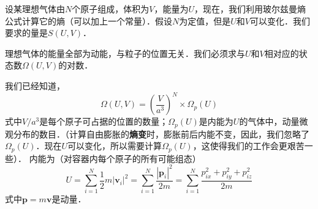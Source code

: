 
设某理想气体由$N $个原子组成，体积为$V$，能量为$U$，现在，我们利用玻尔兹曼熵公式计算它的熵（可以加上一个常量）．假设$N $为定值，但是$U $和$V $可以变化．我们要求的量是$S(U,V)$．

理想气体的能量全部为动能，与粒子的位置无关．我们必须求与$U$和$V$相对应的状态数$\Omega(U,V)$的对数．

我们已经知道，
\begin{equation}
\Omega \left( U,V \right) =\left( \frac{V}{a^3} \right) ^N\times \Omega _p\left( U \right) 
\end{equation}
式中$V/a^3$是每个原子可占据的位置的数量；$\Omega_p(U)$是内能为$U$的气体中，动量微观分布的数目．（计算自由膨胀的\textbf{熵变}时，膨胀前后内能不变，因此，我们忽略了$\Omega_p(U)$．现在$U$可以变化，所以需要计算$\Omega_p(U)$，这使得我们的工作会更艰苦一些）．
内能为（对容器内每个原子的所有可能组态）
\begin{equation}
U=\sum_{i=1}^N{\frac{1}{2}m\left| \boldsymbol{v}_i \right|^2}=\sum_{i=1}^N{\frac{\left| \boldsymbol{p}_i \right|^2}{2m}}=\sum_{i=1}^N{\frac{p_{ix}^{2}+p_{iy}^{2}+p_{iz}^{2}}{2m}}
\end{equation}
式中$\boldsymbol p = m\boldsymbol v$是动量．


